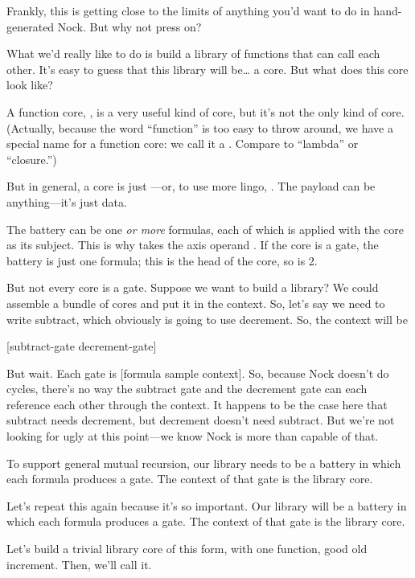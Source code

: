 Frankly, this is getting close to the limits of anything you'd
want to do in hand-generated Nock.  But why not press on?

What we'd really like to do is build a library of functions that
can call each other.  It's easy to guess that this library will
be\ldots{} a core.  But what does this core look like?

A function core, , is a very useful
kind of core, but it's not the only kind of core.  (Actually,
because the word ``function'' is too easy to throw around, we have
a special name for a function core: we call it a .  Compare
to ``lambda'' or ``closure.'')

But in general, a core is just ---or, to use more
lingo, .  The payload can be anything---it's
just data.

The battery can be one \emph{or more} formulas, each of which is
applied with the core as its subject.  This is why  takes the
axis operand .  If the core is a gate, the battery is just one
formula; this is the head of the core, so  is 2.

But not every core is a gate.  Suppose we want to build a
library?  We could assemble a bundle of cores and put it in
the context.  So, let's say we need to write subtract, which
obviously is going to use decrement.  So, the context will be

[subtract-gate decrement-gate]

But wait.  Each gate is [formula sample context].  So, because
Nock doesn't do cycles, there's no way the subtract gate and the
decrement gate can each reference each other through the context.
It happens to be the case here that subtract needs decrement, but
decrement doesn't need subtract.  But we're not looking for ugly
at this point---we know Nock is more than capable of that.

To support general mutual recursion, our library needs to be a
battery in which each formula produces a gate.  The context of
that gate is the library core.

Let's repeat this again because it's so important.  Our library
will be a battery in which each formula produces a gate.  The
context of that gate is the library core.

Let's build a trivial library core of this form, with one
function, good old increment.  Then, we'll call it.

